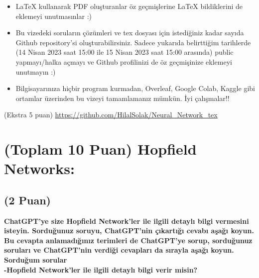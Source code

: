 \documentclass[11pt]{article}
\begin{document}
\begin{itemize}
    \item LaTeX kullanarak PDF oluşturanlar öz geçmişlerine LaTeX bildiklerini de eklemeyi unutmasınlar :)
    \item Bu vizedeki soruların çözümleri ve tex dosyası için istediğiniz kadar sayıda Github repository'si oluşturabilirsiniz. Sadece yukarıda belirttiğim tarihlerde (14 Nisan 2023 saat 15:00 ile 15 Nisan 2023 saat 15:00 arasında) public yapmayı/halka açmayı ve Github profilinizi de öz geçmişinize eklemeyi unutmayın :)
    \item Bilgisayarınıza hiçbir program kurmadan, Overleaf, Google Colab, Kaggle gibi ortamlar üzerinden bu vizeyi tamamlamanız mümkün. İyi çalışmalar!!
\end{itemize}

(Ekstra 5 puan) \url{https://github.com/HilalSolak/Neural_Network_tex}

\newpage
\section{(Toplam 10 Puan) Hopfield Networks:}

\subsection{(2 Puan)} \textbf{ChatGPT’ye size Hopfield Network’ler ile ilgili detaylı bilgi vermesini isteyin. Sorduğunuz soruyu, ChatGPT'nin çıkartığı cevabı aşağı koyun. Bu cevapta anlamadığınız terimleri de ChatGPT’ye sorup, sorduğunuz soruları ve ChatGPT’nin verdiği cevapları da sırayla aşağı koyun.}\\
\textbf{Sorduğum sorular}\\
\textbf{-Hopfield Network’ler ile ilgili detaylı bilgi verir misin?}
 
\end{document}
